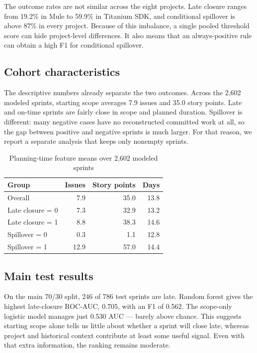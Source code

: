 \documentclass[conference]{IEEEtran}
\begin{document}
The outcome rates are not similar across the eight projects. Late closure ranges from 19.2\% in Mule to 59.9\% in Titanium SDK, and conditional spillover is above 87\% in every project. Because of this imbalance, a single pooled threshold score can hide project-level differences. It also means that an always-positive rule can obtain a high F1 for conditional spillover.

\subsection{Cohort characteristics}
The descriptive numbers already separate the two outcomes. Across the 2,602 modeled sprints, starting scope averages 7.9 issues and 35.0 story points. Late and on-time sprints are fairly close in scope and planned duration. Spillover is different: many negative cases have no reconstructed committed work at all, so the gap between positive and negative sprints is much larger. For that reason, we report a separate analysis that keeps only nonempty sprints.

\begin{table}[!htb]
\centering\scriptsize
\caption{Planning-time feature means over 2,602 modeled sprints}
\label{tab:descriptive}
\setlength{\tabcolsep}{3.2pt}
\begin{tabular}{@{}lrrr@{}}
\toprule
Group & Issues & Story points & Days\\
\midrule
Overall & 7.9 & 35.0 & 13.8\\
Late closure = 0 & 7.3 & 32.9 & 13.2\\
Late closure = 1 & 8.8 & 38.3 & 14.6\\
Spillover = 0 & 0.3 & 1.1 & 12.8\\
Spillover = 1 & 12.9 & 57.0 & 14.4\\
\bottomrule
\end{tabular}
\end{table}

\subsection{Main test results}
On the main 70/30 split, 246 of 786 test sprints are late. Random forest gives the highest late-closure ROC-AUC, 0.705, with an F1 of 0.562. The scope-only logistic model manages just 0.530 AUC --- barely above chance. This suggests starting scope alone tells us little about whether a sprint will close late, whereas project and historical context contribute at least some useful signal. Even with that extra information, the ranking remains moderate.
\end{document}
